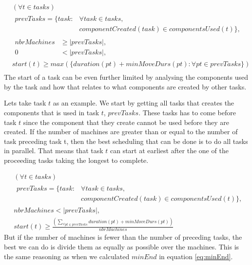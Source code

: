   \begin{equation}
  \begin{aligned}\label{eq:70}
  &(\forall t \in tasks)\\
  &\begin{aligned}
  prevTasks = \{task : &\forall task \in tasks,\\
  &componentCreated(task) \in componentsUsed(t)\},
  \end{aligned}\\
  &\begin{aligned}
  nbrMachines &\ge |prevTasks|,\\
  0 &< |prevTasks|,
  \end{aligned}\\
  &start(t) \ge max(\{duration(pt) + minMoveDurs(pt) : \forall pt \in prevTasks\}) \\
  \end{aligned}
  \end{equation}
  The start of a task can be even further limited by analysing the components used by the task and how that relates to what components are created by other tasks.
  
  Lets take task $t$ as an example. We start by getting all tasks that creates the components that is used in task $t$, $prevTasks$. These tasks has to come before task $t$ since the component that they create cannot be used before they are created. If the number of machines are greater than or equal to the number of task preceding task t, then the best scheduling that can be done is to do all tasks in parallel. That means that task $t$ can start at earliest after the one of the proceeding tasks taking the longest to complete.
  
  \begin{equation}
  \begin{aligned}\label{eq:71}
  &(\forall t \in tasks) \\
  &\begin{aligned}
  prevTasks = \{task : &\forall task \in tasks,\\
  &componentCreated(task) \in componentsUsed(t)\},
  \end{aligned} \\
  &nbrMachines < |prevTasks|,  \\
  &start(t) \ge \frac{\left(\sum_{\forall pt \in prevTasks}duration(pt) + minMoveDurs(pt)\right)}{nbrMachines}
  \end{aligned}
  \end{equation}
  But if the number of machines is fewer than the number of preceding tasks, the best we can do is divide them as equally as possible over the machines. This is the same reasoning as when we calculated $minEnd$ in equation \ref{eq:minEnd}.
  
